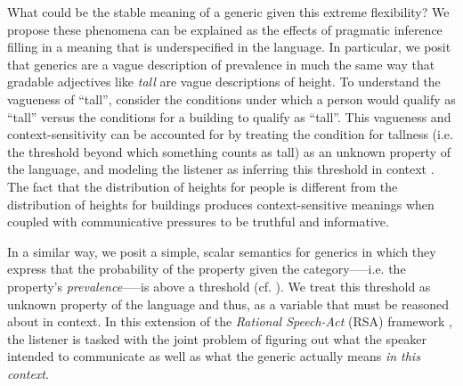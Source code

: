 \documentclass[10pt,letterpaper]{article}
\begin{document}
What could be the stable meaning of a generic given this extreme flexibility? 
We propose these phenomena can be explained as the effects of pragmatic inference filling in a meaning that is underspecified in the language. 
%
In particular, we posit that generics are a vague description of prevalence in much the same way that gradable adjectives like \emph{tall} are vague descriptions of height. 
To understand the vagueness of ``tall'', consider the conditions under which a person would qualify as ``tall'' versus the conditions for a building to qualify as ``tall''.
This vagueness and context-sensitivity can be accounted for by treating the condition for tallness (i.e. the threshold beyond which something counts as tall) as an unknown property of the language, and modeling the listener as inferring this threshold in context \cite{Lassiter2015}. 
The fact that the distribution of heights for people is different from the distribution of heights for buildings produces context-sensitive meanings when coupled 
with communicative pressures to be truthful and informative.
 

In a similar way, we posit a simple, scalar semantics for generics in which they express that the probability of the property given the category-----i.e. the property's \emph{prevalence}-----is above a threshold (cf. ). We treat this threshold as unknown property of the language and thus, as a variable that must be reasoned about in context. In this extension of the \emph{Rational Speech-Act} (RSA) framework \cite{Frank2012,Goodman2013}, the listener is tasked with the joint problem of figuring out what the speaker intended to communicate as well as what the generic actually means \emph{in this context}. 
\end{document}
